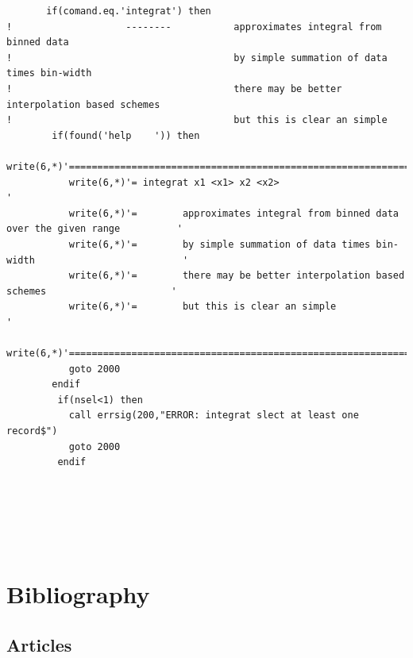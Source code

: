 \documentclass[11pt,fleqn]{book} %
\begin{document}
\begin{verbatim}
       if(comand.eq.'integrat') then
!                    --------           approximates integral from binned data
!                                       by simple summation of data times bin-width
!                                       there may be better interpolation based schemes
!                                       but this is clear an simple                        
        if(found('help    ')) then 
           write(6,*)'=============================================================================='
           write(6,*)'= integrat x1 <x1> x2 <x2>                                                    '
           write(6,*)'=        approximates integral from binned data over the given range          '
           write(6,*)'=        by simple summation of data times bin-width                          '
           write(6,*)'=        there may be better interpolation based schemes                      '
           write(6,*)'=        but this is clear an simple                                          '
           write(6,*)'=============================================================================='
           goto 2000
        endif
         if(nsel<1) then
           call errsig(200,"ERROR: integrat slect at least one record$")
           goto 2000
         endif






\end{verbatim}

\chapter*{Bibliography}


\section*{Articles}
\printbibliography[heading=bibempty,type=article]
\end{document}

